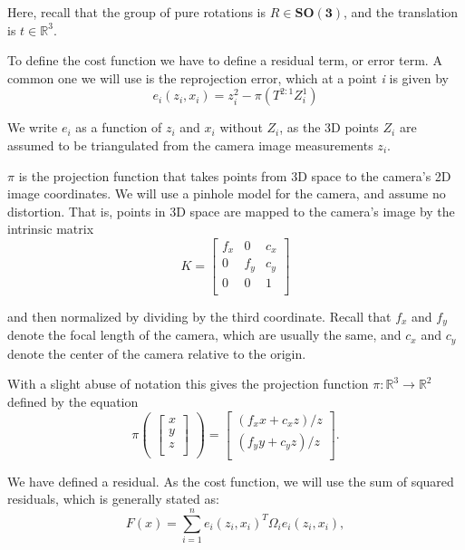 \documentclass[twoside]{article}
\begin{document}
Here, recall that the group of pure rotations is $R \in \mathbf{SO(3)}$, and the translation is $t \in \mathbb{R}^3$.

To define the cost function we have to define a residual term, or error term. A common one we will use is the reprojection error, which at a point \textit{i} is given by
\begin{equation}
e_i(z_i, x_i) = z^2_i - \pi (T^{2:1} Z_i^1)
\end{equation}

We write $e_i$ as a function of $z_i$ and $x_i$ without $Z_i$, as the 3D points $Z_i$ are assumed to be triangulated from the camera image measurements $z_i$.

$\pi$ is the projection function that takes points from 3D space to the camera's 2D image coordinates. We will use a pinhole model for the camera, and assume no distortion. That is, points in 3D space are mapped to the camera's image by the intrinsic matrix
\begin{equation}
K =
\begin{bmatrix}
f_x & 0 & c_x \\
0 & f_y & c_y\\
0 & 0 & 1 \\
\end{bmatrix}
\end{equation}

and then normalized by dividing by the third coordinate. Recall that $f_x$ and $f_y$ denote the focal length of the camera, which are usually the same, and $c_x$ and $c_y$ denote the center of the camera relative to the origin.

With a slight abuse of notation this gives the projection function $\pi : \mathbb{R}^3 \rightarrow \mathbb{R}^2 $ defined by the equation
\begin{equation}
\pi 
\begin{pmatrix}
\begin{bmatrix}
x \\
y \\
z \\
\end{bmatrix}
\end{pmatrix}
 = 
\begin{bmatrix}
(f_xx + c_xz)/z \\
(f_yy + c_yz)/z \\
\end{bmatrix}.
\end{equation}

We have defined a residual. As the cost function, we will use the sum of squared residuals, which is generally stated as:
\begin{equation}
F(x) = \sum_{i=1}^{n} e_i(z_i, x_i)^T \Omega_i e_i(z_i, x_i),
\end{equation}
\end{document}
